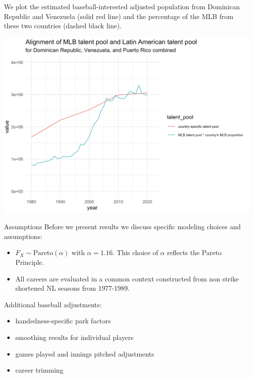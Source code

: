 \documentclass[
  ignorenonframetext,
]{beamer}
\providecommand{\tightlist}{%
  \setlength{\itemsep}{0pt}\setlength{\parskip}{0pt}}
\begin{document}
\begin{frame}{}
\protect\hypertarget{section-11}{}
We plot the estimated baseball-interested adjusted population from
Dominican Republic and Venezuela (solid red line) and the percentage of
the MLB from these two countries (dashed black line).

\includegraphics{DRVen_pop.png}
\end{frame}

\begin{frame}{Assumptions}
\protect\hypertarget{assumptions}{}
Before we present results we discuss specific modeling choices and
assumptions:

\begin{itemize}
\tightlist
\item
  \(F_X \sim \text{Pareto}(\alpha)\) with \(\alpha = 1.16\). This choice
  of \(\alpha\) reflects the Pareto Principle.
\item
  All careers are evaluated in a common context constructed from non
  strike shortened NL seasons from 1977-1989.
\end{itemize}

\vspace{12pt}

Additional baseball adjustments:

\begin{itemize}
\tightlist
\item
  handedness-specific park factors
\item
  smoothing results for individual players
\item
  games played and innings pitched adjustments
\item
  career trimming
\end{itemize}
\end{frame}
\end{document}
